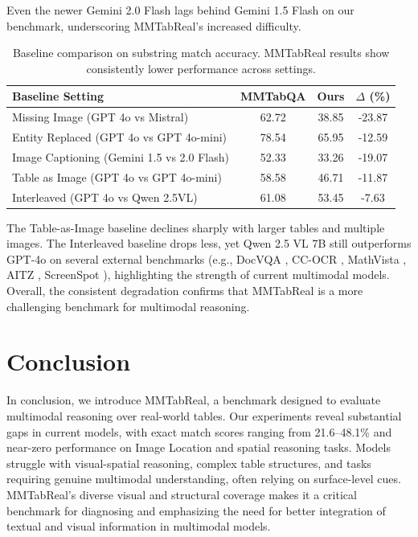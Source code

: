 \documentclass[11pt]{article}
\newcommand{\datasetName}{{\sc MMTabReal}\xspace}
\begin{document}
\noindent Even the newer Gemini 2.0 Flash lags behind Gemini 1.5 Flash on our benchmark, underscoring \datasetName’s increased difficulty.


\begin{table}[!htbp]
\vspace{-0.5em}
\centering
\scriptsize
\setlength{\aboverulesep}{0pt}
\setlength{\belowrulesep}{0pt}
\setlength{\tabcolsep}{3pt}
\begin{tabular}{@{}l|ccc@{}}
\toprule
\textbf{Baseline Setting} & \textbf{MMTabQA} & \textbf{Ours} & \textbf{$\Delta$ (\%)}\\
\midrule
Missing Image (GPT 4o vs Mistral) & 62.72 & 38.85 & \textcolor{olivegreen}{-23.87} \\
Entity Replaced (GPT 4o vs GPT 4o-mini) & 78.54 & 65.95 & \textcolor{olivegreen}{-12.59} \\
Image Captioning (Gemini 1.5 vs 2.0 Flash) & 52.33 & 33.26 & \textcolor{olivegreen}{-19.07} \\
Table as Image (GPT 4o vs GPT 4o-mini) & 58.58 & 46.71 & \textcolor{olivegreen}{-11.87} \\
Interleaved (GPT 4o vs Qwen 2.5VL) & 61.08 & 53.45 & \textcolor{olivegreen}{-7.63} \\
\bottomrule
\end{tabular}
\vspace{-0.5em}
\caption{\small Baseline comparison on substring match accuracy. \datasetName results show consistently lower performance across settings.}
\label{tab:sma-baseline-results}
\vspace{-1.5em}
\end{table}

The Table-as-Image baseline declines sharply with larger tables and multiple images. The Interleaved baseline drops less, yet Qwen 2.5 VL 7B still outperforms GPT-4o on several external benchmarks (e.g., DocVQA \cite{mathew2021docvqa}, CC-OCR \cite{yang2024cc}, MathVista \cite{lu2023mathvista}, AITZ \cite{zhang2024android}, ScreenSpot \cite{li2025screenspot}), highlighting the strength of current multimodal models. Overall, the consistent degradation confirms that \datasetName is a more challenging benchmark for multimodal reasoning.

\section{Conclusion}
\vspace{-0.3em}
In conclusion, we introduce \datasetName, a benchmark designed to evaluate multimodal reasoning over real-world tables. Our experiments reveal substantial gaps in current models, with exact match scores ranging from 21.6–48.1\% and near-zero performance on Image Location and spatial reasoning tasks. Models struggle with visual-spatial reasoning, complex table structures, and tasks requiring genuine multimodal understanding, often relying on surface-level cues. \datasetName’s diverse visual and structural coverage makes it a critical benchmark for diagnosing and emphasizing the need for better integration of textual and visual information in multimodal models.
\end{document}
